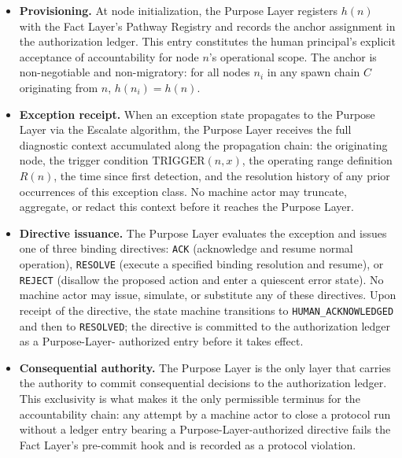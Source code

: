 \begin{itemize}\itemsep=0pt
\item[(\textit{i})] \textbf{Provisioning.}  At node initialization, the Purpose
Layer registers $h(n)$ with the Fact Layer's Pathway Registry and records the
anchor assignment in the authorization ledger.  This entry constitutes the human
principal's explicit acceptance of accountability for node $n$'s operational
scope.  The anchor is non-negotiable and non-migratory: for all nodes $n_i$ in
any spawn chain $C$ originating from $n$, $h(n_i) = h(n)$.

\item[(\textit{ii})] \textbf{Exception receipt.}  When an exception state
propagates to the Purpose Layer via the Escalate algorithm, the Purpose Layer
receives the full diagnostic context accumulated along the propagation chain: the
originating node, the trigger condition $\text{TRIGGER}(n, x)$, the operating
range definition $R(n)$, the time since first detection, and the resolution
history of any prior occurrences of this exception class.  No machine actor may
truncate, aggregate, or redact this context before it reaches the Purpose Layer.

\item[(\textit{iii})] \textbf{Directive issuance.}  The Purpose Layer evaluates
the exception and issues one of three binding directives: \texttt{ACK}
(acknowledge and resume normal operation), \texttt{RESOLVE} (execute a specified
binding resolution and resume), or \texttt{REJECT} (disallow the proposed action
and enter a quiescent error state).  No machine actor may issue, simulate, or
substitute any of these directives.  Upon receipt of the directive, the state
machine transitions to \texttt{HUMAN\_ACKNOWLEDGED} and then to \texttt{RESOLVED};
the directive is committed to the authorization ledger as a Purpose-Layer-
authorized entry before it takes effect.

\item[(\textit{iv})] \textbf{Consequential authority.}  The Purpose Layer is the
only layer that carries the authority to commit consequential decisions to the
authorization ledger.  This exclusivity is what makes it the only permissible
terminus for the accountability chain: any attempt by a machine actor to close a
protocol run without a ledger entry bearing a Purpose-Layer-authorized directive
fails the Fact Layer's pre-commit hook and is recorded as a protocol violation.
\end{itemize}

